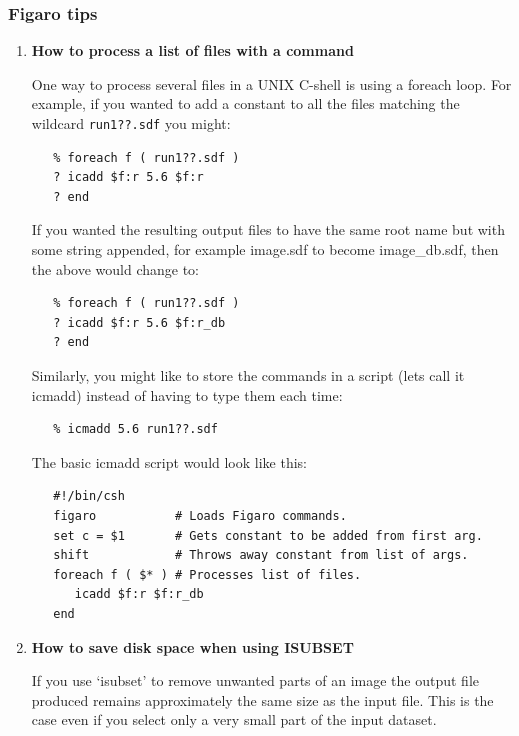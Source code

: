 \subsubsection{\label{news514_figaro_tips}Figaro tips}

\begin{enumerate}

\item {\bf How to process a list of files with a command}

      One way to process several files in a UNIX C-shell is using
      a foreach loop.  For example, if you wanted to add a constant
      to all the files matching the wildcard \verb+run1??.sdf+ you might:

\begin{verbatim}
   % foreach f ( run1??.sdf )
   ? icadd $f:r 5.6 $f:r
   ? end
\end{verbatim}

      If you wanted the resulting output files to have the same root
      name but with some string appended, for example image.sdf to
      become image\_db.sdf, then the above would change to:

\begin{verbatim}
   % foreach f ( run1??.sdf )
   ? icadd $f:r 5.6 $f:r_db
   ? end
\end{verbatim}

      Similarly, you might like to store the commands in a script
      (lets call it icmadd) instead of having to type them each time:

\begin{verbatim}
   % icmadd 5.6 run1??.sdf
\end{verbatim}

      The basic icmadd script would look like this:

\begin{verbatim}
   #!/bin/csh
   figaro           # Loads Figaro commands.
   set c = $1       # Gets constant to be added from first arg.
   shift            # Throws away constant from list of args.
   foreach f ( $* ) # Processes list of files.
      icadd $f:r $f:r_db
   end
\end{verbatim}

\item {\bf How to save disk space when using ISUBSET}

      If you use `isubset' to remove unwanted parts of an image the
      output file produced remains approximately the same size as the
      input file.  This is the case even if you select only a very
      small part of the input dataset.


\end{enumerate}
